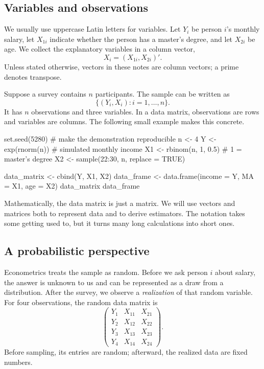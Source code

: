\subsection{Variables and observations}

We usually use uppercase Latin letters for variables.  Let $Y_i$ be person
$i$'s monthly salary, let $X_{1i}$ indicate whether the person has a master's
degree, and let $X_{2i}$ be age.  We collect the explanatory variables in a
column vector,
\[
  X_i=(X_{1i},X_{2i})'.
\]
Unless stated otherwise, vectors in these notes are column vectors; a prime
denotes transpose.

Suppose a survey contains $n$ participants.  The sample can be written as
\[
  \{(Y_i,X_i):i=1,\ldots,n\}.
\]
It has $n$ observations and three variables.  In a data matrix, observations
are rows and variables are columns.  The following small example makes this
concrete.

\begin{rcode}
set.seed(5280)                 # make the demonstration reproducible
n <- 4
Y  <- exp(rnorm(n))            # simulated monthly income
X1 <- rbinom(n, 1, 0.5)        # 1 = master's degree
X2 <- sample(22:30, n, replace = TRUE)

data_matrix <- cbind(Y, X1, X2)
data_frame  <- data.frame(income = Y, MA = X1, age = X2)
data_matrix
data_frame
\end{rcode}

Mathematically, the data matrix is just a matrix.  We will use vectors and
matrices both to represent data and to derive estimators.  The notation takes
some getting used to, but it turns many long calculations into short ones.

\subsection{A probabilistic perspective}

Econometrics treats the sample as random.  Before we ask person $i$ about
salary, the answer is unknown to us and can be represented as a draw from a
distribution.  After the survey, we observe a \emph{realization} of that
random variable.  For four observations, the random data matrix is
\begin{equation}
\label{eq:intro-random-matrix}
  \begin{pmatrix}
    Y_1&X_{11}&X_{21}\\
    Y_2&X_{12}&X_{22}\\
    Y_3&X_{13}&X_{23}\\
    Y_4&X_{14}&X_{24}
  \end{pmatrix}.
\end{equation}
Before sampling, its entries are random; afterward, the realized data are
fixed numbers.


